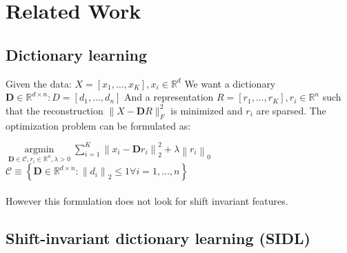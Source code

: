 \documentclass[11pt,a4paper]{article}
\begin{document}
\section{Related Work}

\subsection{ Dictionary learning  }
Given the data: $ X=\left[x_{1}, \ldots, x_{K}\right], x_{i} \in \mathbb{R}^{d} $ 
We want a dictionary $\mathbf{D} \in \mathbb{R}^{d \times n}: D=\left[d_{1}, \ldots, d_{n}\right]$ 
And a representation $R=\left[r_{1}, \ldots, r_{K}\right], r_{i} \in \mathbb{R}^{n}$ such that the reconstruction $\|X-\mathbf{D} R\|_{F}^{2}$ is minimized and $r_{i}$ are sparsed. The optimization problem can be formulated as: 

$\underset{\mathbf{D} \in \mathcal{C}, r_{i} \in \mathbb{R}^{n}, \lambda>0} {\operatorname{argmin}} \sum_{i=1}^{K}\left\|x_{i}-\mathbf{D} r_{i}\right\|_{2}^{2}+\lambda\left\|r_{i}\right\|_{0}$ \\   $\mathcal{C} \equiv\left\{\mathbf{D} \in \mathbb{R}^{d \times n}:\left\|d_{i}\right\|_{2} \leq 1 \forall i=1, \ldots, n\right\} $
\\ \\
However this formulation does not look for shift invariant features. 

\subsection{ Shift-invariant dictionary learning (SIDL)  }
\end{document}
